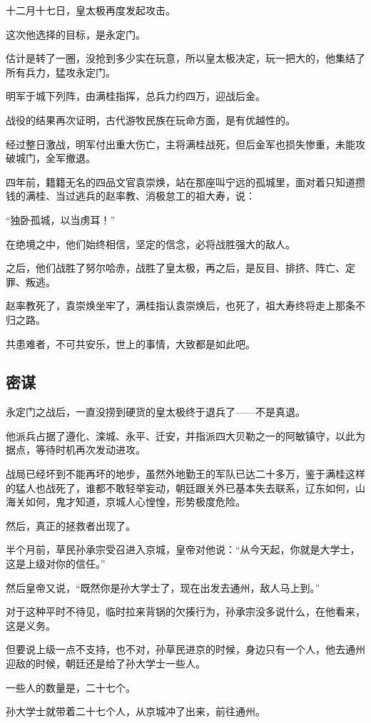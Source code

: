 \begin{multicols}{\theparacolNo}
十二月十七日，皇太极再度发起攻击。

这次他选择的目标，是永定门。

估计是转了一圈，没抢到多少实在玩意，所以皇太极决定，玩一把大的，他集结了所有兵力，猛攻永定门。

明军于城下列阵，由满桂指挥，总兵力约四万，迎战后金。

战役的结果再次证明，古代游牧民族在玩命方面，是有优越性的。

经过整日激战，明军付出重大伤亡，主将满桂战死，但后金军也损失惨重，未能攻破城门，全军撤退。

四年前，籍籍无名的四品文官袁崇焕，站在那座叫宁远的孤城里，面对着只知道攒钱的满桂、当过逃兵的赵率教、消极怠工的祖大寿，说：

“独卧孤城，以当虏耳！”

在绝境之中，他们始终相信，坚定的信念，必将战胜强大的敌人。

之后，他们战胜了努尔哈赤，战胜了皇太极，再之后，是反目、排挤、阵亡、定罪、叛逃。

赵率教死了，袁崇焕坐牢了，满桂指认袁崇焕后，也死了，祖大寿终将走上那条不归之路。

共患难者，不可共安乐，世上的事情，大致都是如此吧。

\subsection{密谋}
永定门之战后，一直没捞到硬货的皇太极终于退兵了——不是真退。

他派兵占据了遵化、滦城、永平、迁安，并指派四大贝勒之一的阿敏镇守，以此为据点，等待时机再次发动进攻。

战局已经坏到不能再坏的地步，虽然外地勤王的军队已达二十多万，鉴于满桂这样的猛人也战死了，谁都不敢轻举妄动，朝廷跟关外已基本失去联系，辽东如何，山海关如何，鬼才知道，京城人心惶惶，形势极度危险。

然后，真正的拯救者出现了。

半个月前，草民孙承宗受召进入京城，皇帝对他说：“从今天起，你就是大学士，这是上级对你的信任。”

然后皇帝又说，“既然你是孙大学士了，现在出发去通州，敌人马上到。”

对于这种平时不待见，临时拉来背锅的欠揍行为，孙承宗没多说什么，在他看来，这是义务。

但要说上级一点不支持，也不对，孙草民进京的时候，身边只有一个人，他去通州迎敌的时候，朝廷还是给了孙大学士一些人。

一些人的数量是，二十七个。

孙大学士就带着二十七个人，从京城冲了出来，前往通州。


\end{multicols}
